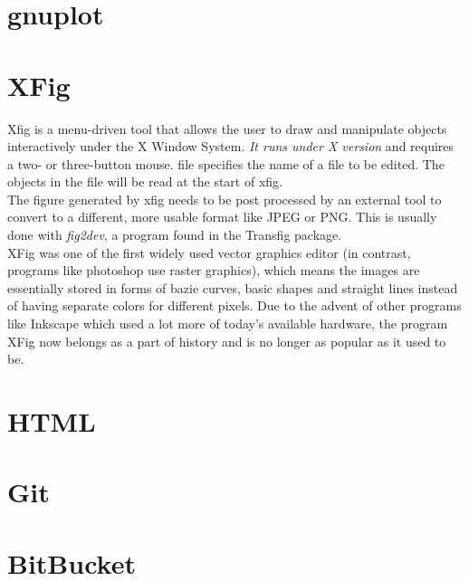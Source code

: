 \documentclass{article}
\begin{document}
\section{gnuplot}
\section{XFig}
Xfig  is a menu-driven tool that allows the user to draw and manipulate
objects interactively under the X Window System.  \emph{ It runs under X
version  } and requires a two- or three-button mouse.
file specifies the name of a file to be edited.   The  objects  in  the
file will be read at the start of xfig.
\\
The figure generated by xfig needs to be post processed by an external tool
to convert to a different, more usable format like JPEG or PNG. This is
usually done with \emph{fig2dev}, a program found in the Transfig package.
\\
XFig was one of the first widely used vector graphics editor (in contrast,
programs like photoshop use raster graphics), which means the images are
essentially stored in forms of bazie curves, basic shapes and straight lines
instead of having separate colors for different pixels. Due to the advent
of other programs like Inkscape which used a lot more of today's available
hardware, the program XFig now belongs as a part of history and is no longer
as popular as it used to be.
\section{HTML}
\section{Git}
\section{BitBucket}
\end{document}
